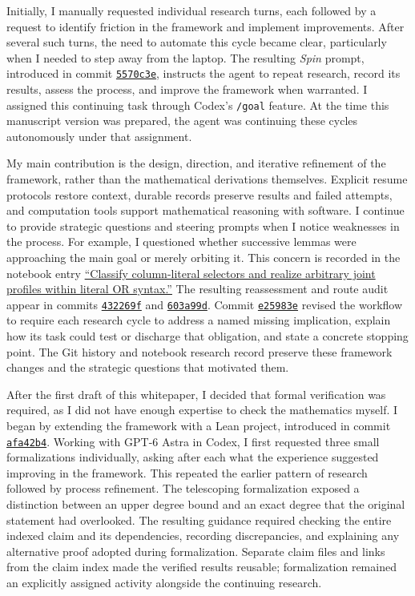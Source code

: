 Initially, I manually requested individual research turns,
each followed by a request to identify friction in the framework and
implement improvements. After several such turns, the need to automate
this cycle became clear, particularly when I needed to step away
from the laptop. The resulting \emph{Spin} prompt, introduced in commit
\href{https://github.com/kbr-/math-research/commit/5570c3e}
{\texttt{5570c3e}}, instructs the agent to repeat research, record its
results, assess the process, and improve the framework when warranted.
I assigned this continuing task through Codex's \texttt{/goal}
feature. At the time this manuscript version was prepared, the agent
was continuing these cycles autonomously under that assignment.

My main contribution is the design, direction, and iterative
refinement of the framework, rather than the mathematical derivations
themselves. Explicit resume protocols restore context, durable records
preserve results and failed attempts, and computation tools support
mathematical reasoning with software. I continue to provide
strategic questions and steering prompts when I notice weaknesses
in the process. For example, I questioned whether successive lemmas
were approaching the main goal or merely orbiting it. This concern is
recorded in the notebook entry
\href{https://kbr.is-a.dev/math-research/\#entry-2026-09-12-column-literal-selector-profiles}
{``Classify column-literal selectors and realize arbitrary joint profiles
within literal OR syntax.''}
The resulting reassessment and route audit appear in commits
\href{https://github.com/kbr-/math-research/commit/432269f}{\texttt{432269f}}
and \href{https://github.com/kbr-/math-research/commit/603a99d}{\texttt{603a99d}}.
Commit \href{https://github.com/kbr-/math-research/commit/e25983e}
{\texttt{e25983e}} revised the workflow to require each research cycle
to address a named missing implication, explain how its task could
test or discharge that obligation, and state a concrete stopping point.
The Git history and notebook research record preserve these framework
changes and the strategic questions that motivated them.

After the first draft of this whitepaper, I decided that formal
verification was required, as I did not have enough expertise to check the
mathematics myself. I began by extending the framework with a Lean project,
introduced in commit
\href{https://github.com/kbr-/math-research/commit/afa42b493549efec332378d1eb40ef55eb335bac}
{\texttt{afa42b4}}. Working with GPT-6 Astra in Codex, I first requested
three small formalizations individually, asking after each what the experience
suggested improving in the framework. This repeated the earlier pattern of
research followed by process refinement. The telescoping formalization exposed
a distinction between an upper degree bound and an exact degree that the
original statement had overlooked. The resulting guidance required checking
the entire indexed claim and its dependencies, recording discrepancies,
and explaining any alternative proof adopted during formalization. Separate
claim files and links from the claim index made the verified results reusable;
formalization remained an explicitly assigned activity alongside the continuing
research.

